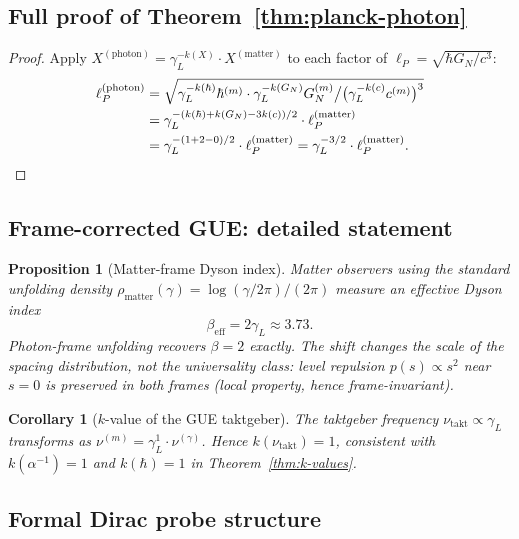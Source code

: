 \documentclass[12pt,a4paper]{article}
\newtheorem{proposition}[theorem]{Proposition}
\newtheorem{corollary}[theorem]{Corollary}
\newcommand{\gL}{\gamma_L}
\newcommand{\lP}{\ell_P}
\begin{document}
\subsection{Full proof of Theorem~\ref{thm:planck-photon}}
\label{app:planck-reintegrated}

\begin{proof}
Apply $X^{(\mathrm{photon})}=\gL^{-k(X)}\cdot X^{(\mathrm{matter})}$
to each factor of $\lP=\sqrt{\hbar G_N/c^3}$:
\begin{align*}
  \lP^{(\mathrm{photon})}
  &= \sqrt{
       \gL^{-k(\hbar)}\hbar^{(m)}
       \cdot\gL^{-k(G_N)}G_N^{(m)}
       \big/
       \bigl(\gL^{-k(c)}c^{(m)}\bigr)^3
     }\\
  &= \gL^{-(k(\hbar)+k(G_N)-3k(c))/2}
     \cdot\lP^{(\mathrm{matter})}\\
  &= \gL^{-(1+2-0)/2}\cdot\lP^{(\mathrm{matter})}
   = \gL^{-3/2}\cdot\lP^{(\mathrm{matter})}.\qedhere
\end{align*}
\end{proof}

\subsection{Frame-corrected GUE: detailed statement}
\label{app:gue-frame-reintegrated}

\begin{proposition}[Matter-frame Dyson index]
Matter observers using the standard unfolding density
$\rho_{\mathrm{matter}}(\gamma)=\log(\gamma/2\pi)/(2\pi)$
measure an effective Dyson index
\[
  \beta_{\mathrm{eff}} = 2\gL\approx 3.73.
\]
Photon-frame unfolding recovers $\beta=2$ exactly.
The shift changes the scale of the spacing distribution, not the
universality class: level repulsion $p(s)\propto s^2$ near $s=0$ is
preserved in both frames (local property, hence frame-invariant).
\end{proposition}

\begin{corollary}[$k$-value of the GUE taktgeber]
The taktgeber frequency $\nu_{\mathrm{takt}}\propto\gL$
transforms as $\nu^{(m)}=\gL^1\cdot\nu^{(\gamma)}$.
Hence $k(\nu_{\mathrm{takt}})=1$, consistent with $k(\alpha^{-1})=1$
and $k(\hbar)=1$ in Theorem~\ref{thm:k-values}.
\end{corollary}

\subsection{Formal Dirac probe structure}
\label{app:dirac-formal-reintegrated}
\end{document}
